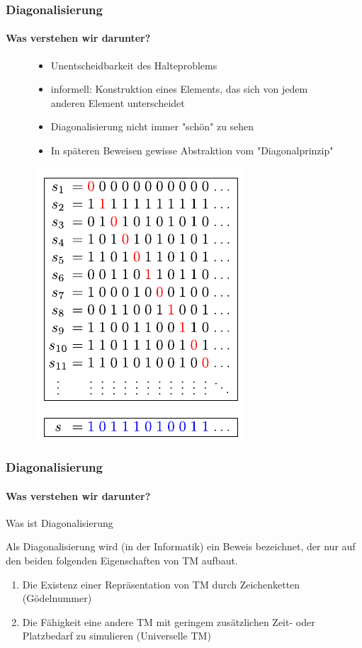 \begin{frame}
	\frametitle{Diagonalisierung}
	\framesubtitle{Was verstehen wir darunter?}
	
	
	


	\begin{figure}
			\begin{minipage}{0.8\linewidth}
				\begin{itemize}[<+->]
					\item Unentscheidbarkeit des Halteproblems
					\item informell: Konstruktion eines Elements, das sich von jedem anderen Element unterscheidet
					\item Diagonalisierung nicht immer "schön" zu sehen
					\item In späteren Beweisen gewisse Abstraktion vom "Diagonalprinzip"
				\end{itemize}
			\end{minipage}
			\begin{minipage}{0.1\linewidth}
					\includegraphics[scale = 0.4]{images/Diagonal_argument_svg.pdf}%
			\end{minipage}
		\end{figure}
	
\end{frame}
\begin{frame}
	\frametitle{Diagonalisierung}
	\framesubtitle{Was verstehen wir darunter?}
	\begin{KITinfoblock}{Was ist Diagonalisierung} {
			Als Diagonalisierung wird (in der Informatik) ein Beweis bezeichnet, der nur auf den beiden folgenden
			Eigenschaften von TM aufbaut.
			
			\begin{enumerate}
				\item<2-> Die Existenz einer Repräsentation von TM durch Zeichenketten (Gödelnummer)
				\item<3-> Die Fähigkeit eine andere TM mit geringem zusätzlichen Zeit- oder Platzbedarf zu simulieren (Universelle TM)
			\end{enumerate}		
		}
	\end{KITinfoblock}
	
\end{frame}